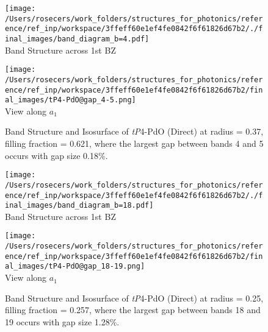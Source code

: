 \begin{figure}[H]
\begin{minipage}{0.5\textwidth}\centering
\texttt{[image: /Users/rosecers/work\_folders/structures\_for\_photonics/reference/ref\_inp/workspace/3ffeff60e1ef4fe0842f6f61826d67b2/./final\_images/band\_diagram\_b=4.pdf]}
\\Band Structure across 1st BZ
\end{minipage}\hfill
\begin{minipage}{0.48\textwidth}\centering
\texttt{[image: /Users/rosecers/work\_folders/structures\_for\_photonics/reference/ref\_inp/workspace/3ffeff60e1ef4fe0842f6f61826d67b2/final\_images/tP4-PdO@gap\_4-5.png]}
\\View along $a_1$ 
\end{minipage}\hfill\caption{Band Structure and Isosurface of \textit{tP}4-PdO (Direct) at radius = 0.37, filling fraction = 0.621, where the largest gap between bands 4 and 5 occurs with gap size 0.18\%.}

\end{figure}
\vspace{-0.25in}


\begin{figure}[H]
\begin{minipage}{0.5\textwidth}\centering
\texttt{[image: /Users/rosecers/work\_folders/structures\_for\_photonics/reference/ref\_inp/workspace/3ffeff60e1ef4fe0842f6f61826d67b2/./final\_images/band\_diagram\_b=18.pdf]}
\\Band Structure across 1st BZ
\end{minipage}\hfill
\begin{minipage}{0.48\textwidth}\centering
\texttt{[image: /Users/rosecers/work\_folders/structures\_for\_photonics/reference/ref\_inp/workspace/3ffeff60e1ef4fe0842f6f61826d67b2/final\_images/tP4-PdO@gap\_18-19.png]}
\\View along $a_1$ 
\end{minipage}\hfill\caption{Band Structure and Isosurface of \textit{tP}4-PdO (Direct) at radius = 0.25, filling fraction = 0.257, where the largest gap between bands 18 and 19 occurs with gap size 1.28\%.}

\end{figure}
\vspace{-0.25in}

